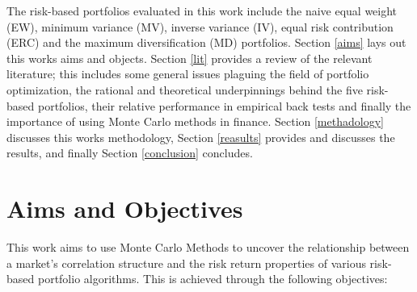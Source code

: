 \documentclass[11pt,preprint, authoryear]{elsarticle}
\numberwithin{equation}{section}
\numberwithin{figure}{section}
\numberwithin{table}{section}
\begin{document}
The risk-based portfolios evaluated in this work include the naive equal
weight (EW), minimum variance (MV), inverse variance (IV), equal risk
contribution (ERC) and the maximum diversification (MD) portfolios.
Section \ref{aims} lays out this works aims and objects. Section
\ref{lit} provides a review of the relevant literature; this includes
some general issues plaguing the field of portfolio optimization, the
rational and theoretical underpinnings behind the five risk-based
portfolios, their relative performance in empirical back tests and
finally the importance of using Monte Carlo methods in finance. Section
\ref{methadology} discusses this works methodology, Section
\ref{reasults} provides and discusses the results, and finally Section
\ref{conclusion} concludes.

\hypertarget{aims-and-objectives}{%
\section{\texorpdfstring{Aims and Objectives
\label{aims}}{Aims and Objectives }}\label{aims-and-objectives}}

This work aims to use Monte Carlo Methods to uncover the relationship
between a market's correlation structure and the risk return properties
of various risk-based portfolio algorithms. This is achieved through the
following objectives:
\end{document}
